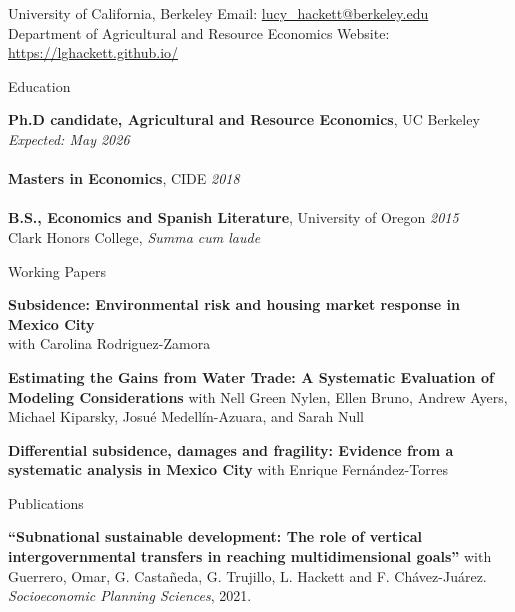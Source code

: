 \documentclass{resume} %
\begin{document}
\begin{rSection}{}
University of California, Berkeley \hfill Email:  \href{mailto:lucy\_hackett@berkeley.edu}{lucy\_hackett@berkeley.edu}\\
Department of Agricultural and Resource Economics \hfill Website:  \href{https://lghackett.github.io/}{https://lghackett.github.io/}\\
\end{rSection}


\begin{rSection}{Education}

{\textbf{Ph.D candidate, Agricultural and Resource Economics}, UC Berkeley} \hfill {\em Expected: May 2026} \\
\\{\textbf{Masters in Economics}, CIDE} \hfill {\em 2018} \\
\\{\textbf{B.S., Economics and Spanish Literature}, University of Oregon} \hfill {\em 2015} 
\\Clark Honors College, \textit{Summa cum laude}   \hfill
\end{rSection}


\begin{rSection}{Working Papers}
\item \textbf{Subsidence: Environmental risk and housing market response in Mexico City} \\ with Carolina Rodriguez-Zamora
\item \textbf{Estimating the Gains from Water Trade: A Systematic Evaluation of Modeling Considerations} with Nell Green Nylen, Ellen Bruno, Andrew Ayers, Michael Kiparsky, Josué Medellín-Azuara, and Sarah Null
\item \textbf{Differential subsidence, damages and fragility: Evidence from a systematic analysis in Mexico City} with Enrique Fernández-Torres
\end{rSection}

\begin{rSection}{Publications}
\item \textbf{``Subnational sustainable development: The role of vertical intergovernmental transfers in reaching multidimensional goals''} with Guerrero, Omar, G. Castañeda, G. Trujillo, L. Hackett and F. Chávez-Juárez. \textit{Socioeconomic Planning Sciences}, 2021.
\end{rSection}
\end{document}
